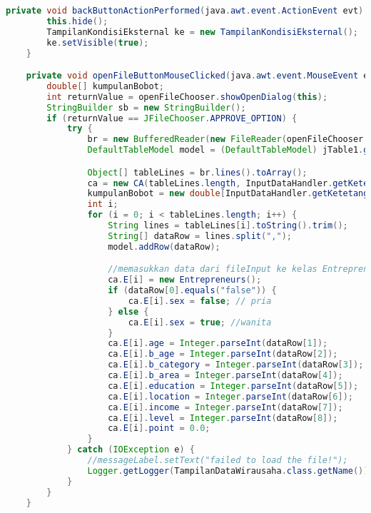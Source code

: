 \begin{lstlisting}[language=Java, caption=TampilanDataWirausaha.java]
    private void backButtonActionPerformed(java.awt.event.ActionEvent evt) {                                           
        this.hide();
        TampilanKondisiEksternal ke = new TampilanKondisiEksternal();
        ke.setVisible(true);
    }                                          

    private void openFileButtonMouseClicked(java.awt.event.MouseEvent evt) {                                            
        double[] kumpulanBobot;
        int returnValue = openFileChooser.showOpenDialog(this);
        StringBuilder sb = new StringBuilder();
        if (returnValue == JFileChooser.APPROVE_OPTION) {
            try {
                br = new BufferedReader(new FileReader(openFileChooser.getSelectedFile()));
                DefaultTableModel model = (DefaultTableModel) jTable1.getModel();

                Object[] tableLines = br.lines().toArray();
                ca = new CA(tableLines.length, InputDataHandler.getKetetanggaan(), 4);
                kumpulanBobot = new double[InputDataHandler.getKetetanggaan()];
                int i;
                for (i = 0; i < tableLines.length; i++) {
                    String lines = tableLines[i].toString().trim();
                    String[] dataRow = lines.split(",");
                    model.addRow(dataRow);

                    //memasukkan data dari fileInput ke kelas Entrepreneurs ca
                    ca.E[i] = new Entrepreneurs();
                    if (dataRow[0].equals("false")) {
                        ca.E[i].sex = false; // pria
                    } else {
                        ca.E[i].sex = true; //wanita
                    }
                    ca.E[i].age = Integer.parseInt(dataRow[1]);
                    ca.E[i].b_age = Integer.parseInt(dataRow[2]);
                    ca.E[i].b_category = Integer.parseInt(dataRow[3]);
                    ca.E[i].b_area = Integer.parseInt(dataRow[4]);
                    ca.E[i].education = Integer.parseInt(dataRow[5]);
                    ca.E[i].location = Integer.parseInt(dataRow[6]);
                    ca.E[i].income = Integer.parseInt(dataRow[7]);
                    ca.E[i].level = Integer.parseInt(dataRow[8]);
                    ca.E[i].point = 0.0;
                }
            } catch (IOException e) {
                //messageLabel.setText("failed to load the file!");
                Logger.getLogger(TampilanDataWirausaha.class.getName()).log(Level.SEVERE, null, e);
            }
        }
    }                                           


\end{lstlisting}

